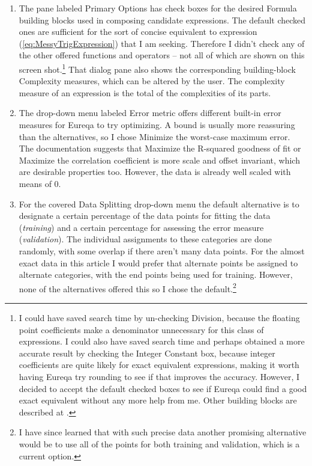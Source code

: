 \documentclass[12pt,english]{article}
\begin{document}
\begin{enumerate}
\begin{enumerate}
\item The pane labeled \textsf{Primary Options} has check boxes for the
desired \textsf{Formula building blocks} used in composing candidate
 expressions. The default checked ones are sufficient for the
sort of concise equivalent to expression (\ref{eq:MessyTrigExpression})
that I am seeking. Therefore I didn't check any of the other offered
functions and operators -- not all of which are shown on this screen
shot.\footnote{I could have saved search time by un-checking \textsf{Division}, because
the floating point coefficients make a denominator unnecessary for
this class of expressions. I could also have saved search time and
perhaps obtained a more accurate result by checking the \textsf{Integer
Constant} box, because integer coefficients are quite likely for exact
equivalent expressions, making it worth having Eureqa try rounding
to see if that improves the accuracy. However, I decided to accept
the default checked boxes to see if Eureqa could find a good exact
equivalent without any more help from me. Other building blocks are
described at \cite{EureqaBuildingBlocks}.} That dialog pane also shows the corresponding building-block \textsf{Complexity}
measures, which can be altered by the user. The complexity measure
of an expression is the total of the complexities of its parts.\vspace{-3pt}

\item The drop-down menu labeled \textsf{Error metric} offers different
built-in error measures for Eureqa to try optimizing. A bound is usually
more reassuring than the alternatives, so I chose \textsf{Minimize
the worst-case maximum error}. The documentation suggests that \textsf{Maximize
the R-squared goodness of fit} or \textsf{Maximize the correlation
coefficient} is more scale and offset invariant, which are desirable
properties too. However, the data is already well scaled with means
of 0.\vspace{-3pt}

\item For the covered \textsf{Data Splitting} drop-down menu the default
alternative is to designate a certain percentage of the data points
for fitting the data (\textsl{training}) and a certain percentage
for assessing the error measure (\textsl{validation}). The individual
assignments to these categories are done randomly, with some overlap
if there aren't many data points. For the almost exact data in this
article I would prefer that alternate points be assigned to alternate
categories, with the end points being used for training. However,
none of the alternatives offered this so I chose the default.\footnote{I have since learned that with such precise data another promising
alternative would be to use all of the points for both training and
validation, which is a current option.}\vspace{-5pt}


\end{enumerate}
\end{enumerate}
\end{document}
